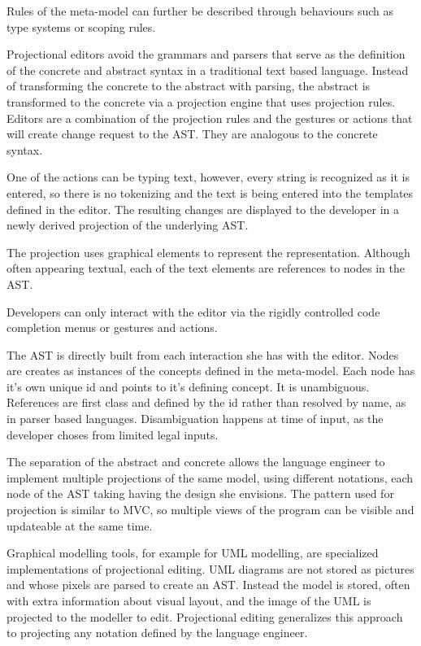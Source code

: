 Rules of the meta-model can further be described through behaviours such as type systems or scoping rules.

Projectional editors avoid the grammars and parsers that serve as the definition of the concrete and abstract syntax in a traditional text based language.
Instead of transforming the concrete to the abstract with parsing, the abstract is transformed to the concrete via a projection engine that uses projection rules.
Editors are a combination of the projection rules and the gestures or actions that will create change request to the AST.
They are analogous to the concrete syntax.

One of the actions can be typing text, however, every string is recognized as it is entered, so there is no tokenizing and the text is being entered into the templates defined in the editor.
The resulting changes are displayed to the developer in a newly derived projection of the underlying AST.

The projection uses graphical elements to represent the representation.
Although often appearing textual, each of the text elements are references to nodes in the AST.

Developers can only interact with the editor via the rigidly controlled code completion menus or gestures and actions. 
    
The AST is directly built from each interaction she has with the editor.
Nodes are creates as instances of the concepts defined in the meta-model.
Each node has it's own unique id and points to it's defining concept.
It is unambiguous.
References are first class and defined by the id rather than resolved by name, as in parser based languages.
Disambiguation happens at time of input, as the developer choses from limited legal inputs.

The separation of the abstract and concrete allows the language engineer to implement multiple projections of the same model, using different notations, each node of the AST taking having the design she envisions.
The pattern used for projection is similar to MVC, so multiple views of the program can be visible and updateable at the same time.

Graphical modelling tools, for example for UML modelling, are specialized implementations of projectional editing.
UML diagrams are not stored as pictures and whose pixels are parsed to create an AST.
Instead the model is stored, often with extra information about visual layout, and the image of the UML is projected to the modeller to edit.
Projectional editing generalizes this approach to projecting any notation defined by the language engineer.


